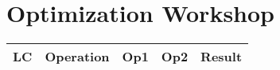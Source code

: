 \documentclass[a4paper,11pt]{article}
\begin{document}

\section*{Optimization Workshop}
\begin{tabular}{ | c | c | r | r | r |}
  \hline
    LC & Operation & Op1 & Op2 & Result  \\ \hline
\end{tabular}

\end{document}

